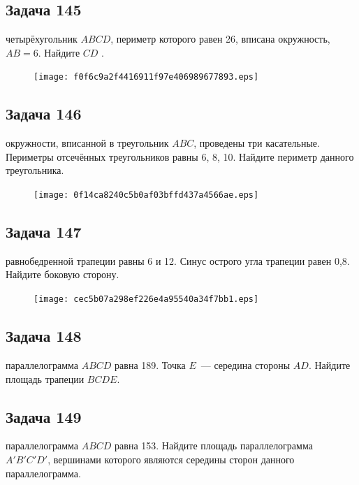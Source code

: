 \documentclass[a4paper,10pt]{article} %
\begin{document}
\begin{spacing}{1.0}
{\subsection*{Задача 145}
 четырёхугольник $ABCD$, периметр которого равен 26, вписана окружность, $AB=6$. Найдите $CD$ .

\vspace{1.5cm}

\begin{figure}{\texttt{[image: f0f6c9a2f4416911f97e406989677893.eps]}}\end{figure}
\subsection*{Задача 146}
 окружности, вписанной в треугольник $ABC$, проведены три касательные. Периметры отсечённых треугольников равны 6, 8, 10. Найдите периметр данного треугольника.

\vspace{1.5cm}

\begin{figure}{\texttt{[image: 0f14ca8240c5b0af03bffd437a4566ae.eps]}}\end{figure}
\subsection*{Задача 147}
 равнобедренной трапеции равны 6 и 12. Синус острого угла трапеции равен 0,8. Найдите боковую сторону.

\vspace{1.5cm}

\begin{figure}{\texttt{[image: cec5b07a298ef226e4a95540a34f7bb1.eps]}}\end{figure}
\subsection*{Задача 148}
 параллелограмма $ABCD$ равна 189. Точка $E$~--- середина стороны $AD$. Найдите площадь трапеции $BCDE$.

\vspace{1.5cm}

\subsection*{Задача 149}
 параллелограмма $ABCD$ равна 153. Найдите площадь параллелограмма $A'B'C'D'$, вершинами которого являются середины сторон данного параллелограмма.

}
\end{spacing}
\end{document}
